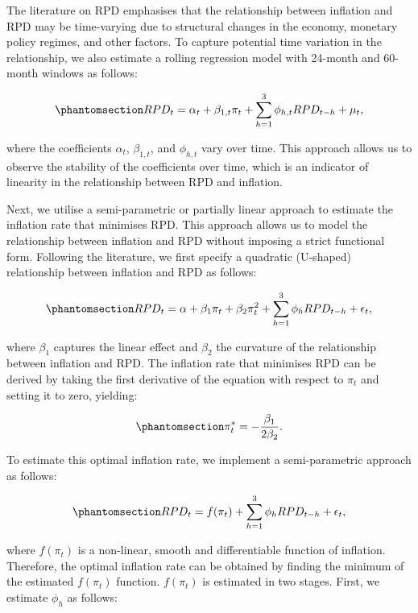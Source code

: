 \documentclass[
  letterpaper,
  DIV=11,
  numbers=noendperiod]{scrartcl}
\begin{document}
The literature on RPD emphasises that the relationship between inflation
and RPD may be time-varying due to structural changes in the economy,
monetary policy regimes, and other factors. To capture potential time
variation in the relationship, we also estimate a rolling regression
model with 24-month and 60-month windows as follows:

\begin{equation}\phantomsection\label{eq-rpd_rolling_reg}{RPD_{t} = \alpha_{t} + \beta_{1,t}\pi_{t} + \sum_{h=1}^{3}\phi_{h,t}RPD_{t-h}  +  \mu_{t}, }\end{equation}

where the coefficients \(\alpha_{t}\), \(\beta_{1,t}\), and
\(\phi_{h,t}\) vary over time. This approach allows us to observe the
stability of the coefficients over time, which is an indicator of
linearity in the relationship between RPD and inflation.

Next, we utilise a semi-parametric or partially linear approach to
estimate the inflation rate that minimises RPD. This approach allows us
to model the relationship between inflation and RPD without imposing a
strict functional form. Following the literature, we first specify a
quadratic (U-shaped) relationship between inflation and RPD as follows:

\begin{equation}\phantomsection\label{eq-rpd_semi_parametric}{RPD_t = \alpha + \beta_1\pi_t + \beta_2\pi_t^2 + \sum_{h=1}^{3}\phi_hRPD_{t-h} + \epsilon_t, }\end{equation}

where \(\beta_1\) captures the linear effect and \(\beta_2\) the
curvature of the relationship between inflation and RPD. The inflation
rate that minimises RPD can be derived by taking the first derivative of
the equation with respect to \(\pi_t\) and setting it to zero, yielding:

\begin{equation}\phantomsection\label{eq-optimal_inflation}{\pi_t^* = -\dfrac{\beta_1}{2\beta_2}.}\end{equation}

To estimate this optimal inflation rate, we implement a semi-parametric
approach as follows:

\begin{equation}\phantomsection\label{eq-rpd_semi_parametric_f}{RPD_t =  f(\pi_t) + \sum_{h=1}^{3}\phi_hRPD_{t-h} + \epsilon_t, }\end{equation}

where \(f(\pi_t)\) is a non-linear, smooth and differentiable function
of inflation. Therefore, the optimal inflation rate can be obtained by
finding the minimum of the estimated \(f(\pi_t)\) function. \(f(\pi_t)\)
is estimated in two stages. First, we estimate \(\phi_h\) as follows:
\end{document}

